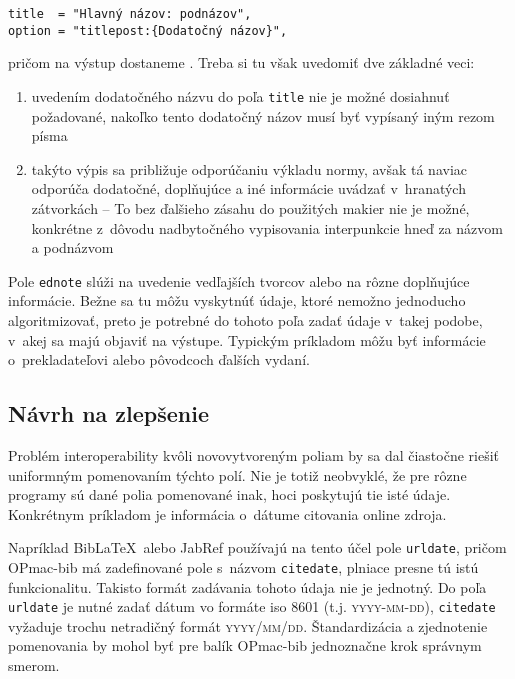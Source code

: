 \documentclass[
  color,
  table,
  nolof,
  oneside,
]{fithesis3}
\begin{document}
\begin{verbatim}
title  = "Hlavný názov: podnázov",
option = "titlepost:{Dodatočný názov}",
\end{verbatim}

\noindent pričom na výstup dostaneme . Treba si tu však uvedomiť dve základné veci:

\begin{enumerate}
\item uvedením dodatočného názvu do poľa \texttt{title} nie je možné dosiahnuť požadované, nakoľko tento dodatočný názov musí byť vypísaný iným rezom písma
\item takýto výpis sa približuje odporúčaniu výkladu normy, avšak tá naviac odporúča dodatočné, doplňujúce a iné informácie uvádzať v~hranatých zátvorkách -- To bez ďalšieho zásahu do použitých makier nie je možné, konkrétne z~dôvodu nadbytočného vypisovania interpunkcie hneď za názvom a podnázvom
\end{enumerate}

Pole \texttt{ednote} slúži na uvedenie vedľajších tvorcov alebo na rôzne doplňujúce informácie. Bežne sa tu môžu vyskytnúť údaje, ktoré nemožno jednoducho algoritmizovať, preto je potrebné do tohoto poľa zadať údaje v~takej podobe, v~akej sa majú objaviť na výstupe. Typickým príkladom môžu byť informácie o~prekladateľovi alebo pôvodcoch ďalších vydaní.

\subsection{Návrh na zlepšenie}

Problém interoperability kvôli novovytvoreným poliam by sa dal čiastočne riešiť uniformným pomenovaním týchto polí. Nie je totiž neobvyklé, že pre rôzne programy sú dané polia pomenované inak, hoci poskytujú tie isté údaje. Konkrétnym príkladom je informácia o~dátume citovania online zdroja.

Napríklad Bib\LaTeX\ alebo JabRef používajú na tento účel pole \texttt{urldate}, pričom OPmac-bib má zadefinované pole s~názvom \texttt{citedate}, plniace presne tú istú funkcionalitu. Takisto formát zadávania tohoto údaja nie je jednotný. Do poľa \texttt{urldate} je nutné zadať dátum vo formáte \gls{iso} 8601 (t.j. \textsc{yyyy-mm-dd}), \texttt{citedate} vyžaduje trochu netradičný formát \textsc{yyyy/mm/dd}. Štandardizácia a zjednotenie pomenovania by mohol byť pre balík OPmac-bib jednoznačne krok správnym smerom.
\end{document}

